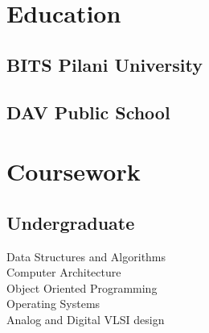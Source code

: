 \documentclass[]{Ayushi-resume}
\begin{document}
%
%
\lastupdated

%
%

%
%

\begin{minipage}[t]{0.33\textwidth} 


\section{Education} 
\vspace{\topsep}
\subsection{BITS Pilani University}
\sectionsep

\subsection{DAV Public School}
\vspace{\topsep}
\sectionsep


\section{Coursework}
\vspace{\topsep}
\subsection{Undergraduate}
Data Structures and Algorithms \\
Computer Architecture\\
Object Oriented Programming\\
Operating Systems \\
Analog and Digital VLSI design\\


\end{minipage}
\end{document}
